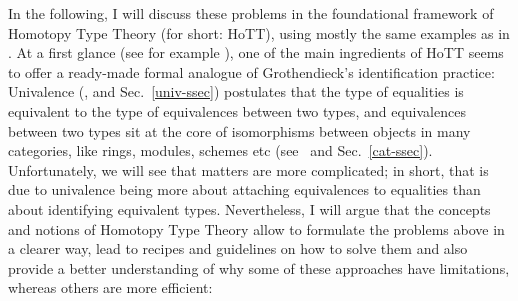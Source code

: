 \documentclass{amsart}
\theoremstyle{plain}
\numberwithin{equation}{section} %
\numberwithin{figure}{section} %
\theoremstyle{plain}
\theoremstyle{plain}
\theoremstyle{plain}
\theoremstyle{plain}
\theoremstyle{plain}
\theoremstyle{plain}
\theoremstyle{remark}
\theoremstyle{remark}
\theoremstyle{remark}
\begin{document}
In the following, I will discuss these problems in the foundational framework of Homotopy Type Theory (for short: HoTT), using mostly the same examples as in \cite{Buz24}. At a first glance (see for example \cite{HoTTBook, Rij22}), one of the main ingredients of HoTT seems to offer a ready-made formal analogue of Grothendieck's identification practice: Univalence (\cite{Voe06}, \cite[Introduction \& Ch.4]{HoTTBook} and Sec.~\ref{univ-ssec}) postulates that the type of equalities is equivalent to the type of equivalences between two types, and equivalences between two types sit at the core of isomorphisms between objects in many categories, like rings, modules, schemes etc (see~\cite[Ch.9]{HoTTBook} and Sec.~\ref{cat-ssec}). Unfortunately, we will see that matters are more complicated; in short, that is due to univalence being more about attaching equivalences to equalities than about identifying equivalent types. Nevertheless, I will argue that the concepts and notions of Homotopy Type Theory allow to formulate the problems above in a clearer way, lead to recipes and guidelines on how to solve them and also provide a better understanding of why some of these approaches have limitations, whereas others are more efficient:
\end{document}
